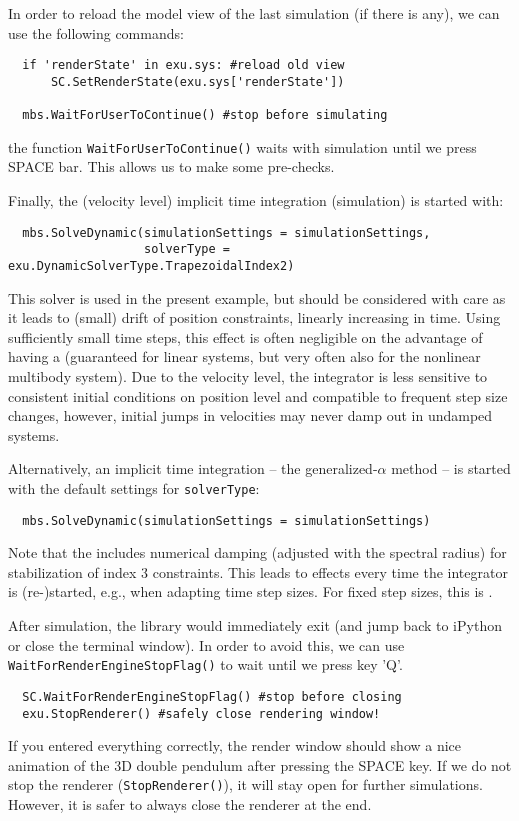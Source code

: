 \noindent In order to reload the model view of the last simulation (if there is any), we can use the following commands:
\pythonstyle\begin{lstlisting}
  if 'renderState' in exu.sys: #reload old view
      SC.SetRenderState(exu.sys['renderState'])

  mbs.WaitForUserToContinue() #stop before simulating
\end{lstlisting}
the function \texttt{WaitForUserToContinue()} waits with simulation until we press SPACE bar. This allows us to make some pre-checks.

\noindent Finally, the  (velocity level) implicit time integration (simulation) is started with:
\pythonstyle\begin{lstlisting}
  mbs.SolveDynamic(simulationSettings = simulationSettings,
                   solverType = exu.DynamicSolverType.TrapezoidalIndex2)
\end{lstlisting}
This solver is used in the present example, but should be considered with care as it leads to (small) drift of position constraints, linearly increasing in time. Using sufficiently small time steps, this effect is often negligible on the advantage of having a  (guaranteed for linear systems, but very often also for the nonlinear multibody system). Due to the velocity level, the integrator is less sensitive to consistent initial conditions on position level and compatible to frequent step size changes, however, initial jumps in velocities may never damp out in undamped systems.

\noindent Alternatively, an  implicit time integration -- the generalized-$\alpha$ method -- is started with the default settings for \texttt{solverType}:
\pythonstyle\begin{lstlisting}
  mbs.SolveDynamic(simulationSettings = simulationSettings)
\end{lstlisting}
Note that the  includes numerical damping (adjusted with the spectral radius) for stabilization of index 3 constraints. This leads to effects every time the integrator is (re-)started, e.g., when adapting time step sizes. For fixed step sizes, this is .

\noindent After simulation, the library would immediately exit (and jump back to iPython or close the terminal window). In order to avoid this, we can use \texttt{WaitForRenderEngineStopFlag()} to wait until we press key 'Q'.
\pythonstyle\begin{lstlisting}
  SC.WaitForRenderEngineStopFlag() #stop before closing
  exu.StopRenderer() #safely close rendering window!
\end{lstlisting}
If you entered everything correctly, the render window should show a nice animation of the 3D double pendulum after pressing the SPACE key. 
If we do not stop the renderer (\texttt{StopRenderer()}), it will stay open for further simulations. However, it is safer to always close the renderer at the end.

